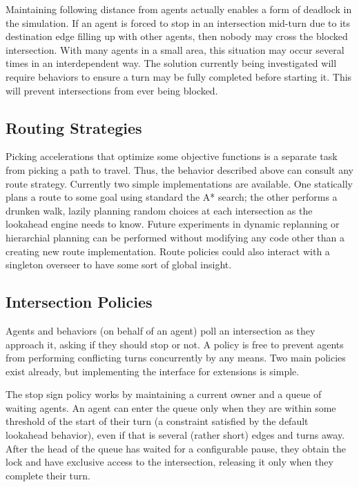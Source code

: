 \documentclass[letterpaper, 10 pt, conference]{ieeeconf}  %
\begin{document}
Maintaining following distance from agents actually enables a form of deadlock
in the simulation. If an agent is forced to stop in an intersection mid-turn due
to its destination edge filling up with other agents, then nobody may cross the
blocked intersection. With many agents in a small area, this situation may
occur several times in an interdependent way. The solution currently being
investigated will require behaviors to ensure a turn may be fully completed
before starting it. This will prevent intersections from ever being blocked.


\subsection{Routing Strategies}

Picking accelerations that optimize some objective functions is a separate task
from picking a path to travel. Thus, the behavior described above can consult
any route strategy. Currently two simple implementations are available. One
statically plans a route to some goal using standard the A* search; the other
performs a drunken walk, lazily planning random choices at each intersection as
the lookahead engine needs to know. Future experiments in dynamic replanning or
hierarchial planning can be performed without modifying any code other than a
creating new route implementation. Route policies could also interact with a
singleton overseer to have some sort of global insight.

\subsection{Intersection Policies}

Agents and behaviors (on behalf of an agent) poll an intersection as they
approach it, asking if they should stop or not. A policy is free to prevent
agents from performing conflicting turns concurrently by any means. Two main
policies exist already, but implementing the interface for extensions is simple.

The stop sign policy works by maintaining a current owner and a queue of waiting
agents. An agent can enter the queue only when they are within some threshold of
the start of their turn (a constraint satisfied by the default lookahead
behavior), even if that is several (rather short) edges and turns away. After
the head of the queue has waited for a configurable pause, they obtain the lock
and have exclusive access to the intersection, releasing it only when they
complete their turn.
\end{document}
